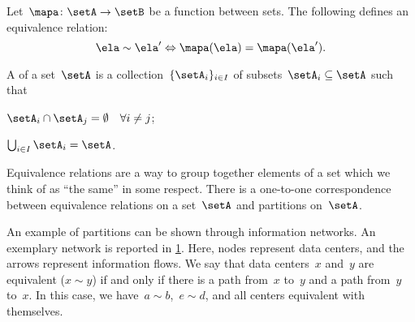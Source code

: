 \begin{example}
  Let~$\mapa\colon \setA\to \setB$ be a function between sets. The following defines an equivalence relation:
  \begin{equation*}
    \ela\sim \ela'\Leftrightarrow \mapa(\ela)=\mapa(\ela').
  \end{equation*}
\end{example}

\begin{definition}[Partition]
  \label{def:partition}
  A \emph{} of a set~$\setA$ is a collection~$\{\setA_i\}_{i\in I}$ of subsets~$\setA_i\subseteq \setA$ such that
  \begin{compactenum}
    \item $\setA_i\cap \setA_j=\emptyset \quad \forall i\neq j$;
    \item $\bigcup_{i\in I}\setA_i=\setA$.
  \end{compactenum}
\end{definition}

\begin{remark}
  Equivalence relations are a way to group together elements of a set which we think of as ``the same'' in some respect. There is a one-to-one correspondence between equivalence relations on a set~$\setA$ and partitions on~$\setA$.
\end{remark}

\begin{example}
  An example of partitions can be shown through information networks.
  An exemplary network is reported in \cref{fig:info_network}.
  Here, nodes represent data centers, and the arrows represent information flows.
  We say that data centers~$x$ and~$y$ are equivalent ($x\sim y$) if and only if there is a path from~$x$ to~$y$ and a path from~$y$ to~$x$.
  In this case, we have~$a\sim b$,~$e\sim d$, and all centers equivalent with themselves.
\end{example}

\begin{figure}[h!]
  \begin{center}
  \end{center}
  \caption{}
  \label{fig:info_network}
\end{figure}
